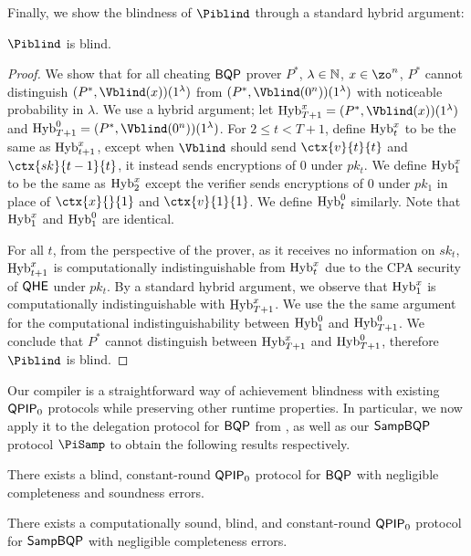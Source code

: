 Finally, we show the blindness of $\Piblind$ through a standard hybrid argument:
\begin{theorem}
	$\Piblind$ is blind.
\end{theorem}
\begin{proof}
	We show that for all cheating $\operatorname{\mathsf{BQP}}$ prover $P^*$, $\lambda\in\mathbb{N}$, $x\in\zo^n$,
	$P^*$ cannot distinguish $(P^*, \Vblind(x))(1^\lambda)$ from $(P^*, \Vblind(0^n))(1^\lambda)$ with noticeable probability in $\lambda$.
	We use a hybrid argument; let $\Hyb_{T+1}^x=(P^*, \Vblind(x))(1^\lambda)$ and $\Hyb_{T+1}^0=(P^*, \Vblind(0^n))(1^\lambda)$.
	For $2\leq t<T+1$, define $\operatorname{Hyb}_t^x$ to be the same as $\operatorname{Hyb}_{t+1}^x$,
	except when $\Vblind$ should send $\ctx{v}{t}{t}$ and $\ctx{sk}{t-1}{t}$, it instead sends encryptions of $0$ under $pk_t$.
	We define $\operatorname{Hyb}_1^x$ to be the same as $\operatorname{Hyb}_2^x$ except the verifier sends encryptions of $0$ under $pk_1$ in place of $\ctx{x}{}{1}$ and $\ctx{v}{1}{1}$.
	We define $\operatorname{Hyb}_t^0$ similarly. Note that $\operatorname{Hyb}_1^x$ and $\operatorname{Hyb}_1^0$ are identical.

	For all $t$, from the perspective of the prover,
	as it receives no information on $sk_t$,
	$\operatorname{Hyb}_{t+1}^x$ is computationally indistinguishable from $\operatorname{Hyb}_t^x$ due to the CPA security of $\mathsf{QHE}$ under $pk_t$.
	By a standard hybrid argument, we observe that $\operatorname{Hyb}_1^x$ is computationally indistinguishable with $\operatorname{Hyb}_{T+1}^x$.
	We use the the same argument for the computational indistinguishability between $\operatorname{Hyb}_1^0$ and $\operatorname{Hyb}_{T+1}^0$.
	We conclude that $P^*$ cannot distinguish between $\operatorname{Hyb}_{T+1}^x$ and $\operatorname{Hyb}_{T+1}^0$,
	therefore $\Piblind$ is blind.
\end{proof}

Our compiler is a straightforward way of achievement blindness with existing $\operatorname{\mathsf{QPIP}}_0$ protocols while preserving other runtime properties.
In particular, we now apply it to the delegation protocol for $\operatorname{\mathsf{BQP}}$ from \cite{parallelrep, alagic2019twomessage},
as well as our $\operatorname{\mathsf{SampBQP}}$ protocol $\PiSamp$ to obtain the following results respectively.


\begin{theorem}
	There exists a blind, constant-round $\operatorname{\mathsf{QPIP}}_0$ protocol for $\operatorname{\mathsf{BQP}}$ with negligible completeness and soundness errors.
\end{theorem}

\begin{theorem}
	There exists a computationally sound, blind, and constant-round $\operatorname{\mathsf{QPIP}}_0$ protocol for $\operatorname{\mathsf{SampBQP}}$ with negligible completeness errors.
\end{theorem}
